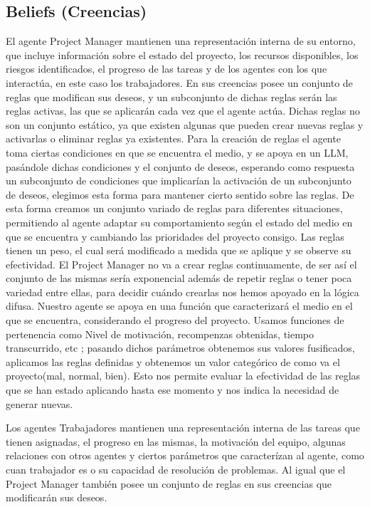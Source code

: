 \documentclass[a4paper, 12pt]{article}
\begin{document}
\subsection{Beliefs (Creencias)}
El agente Project Manager mantienen una representación interna de su entorno, que incluye información sobre el estado del proyecto, los recursos disponibles, los riesgos identificados, el progreso de las tareas y de los agentes con los que interactúa, en este caso los trabajadores. En sus creencias posee un conjunto de reglas que modifican sus deseos, y un subconjunto de dichas reglas serán las reglas activas, las que se aplicarán cada vez que el agente actúa. Dichas reglas no son un conjunto estático, ya que existen algunas que pueden crear nuevas reglas y activarlas o eliminar reglas ya existentes. Para la creación de reglas el agente toma ciertas condiciones en que se encuentra el medio, y se apoya en un LLM, pasándole dichas condiciones y el conjunto de deseos, esperando como respuesta un subconjunto de condiciones que implicarían la activación de un subconjunto de deseos, elegimos esta forma para mantener cierto sentido sobre las reglas. De esta forma creamos un conjunto variado de reglas para diferentes situaciones, permitiendo al agente adaptar su comportamiento según el estado del medio en que se encuentra y cambiando las prioridades del proyecto consigo. Las reglas tienen un peso, el cual será modificado a medida que se aplique y se observe su efectividad. 
El Project Manager no va a crear reglas continuamente, de ser así el conjunto de las mismas sería exponencial además de repetir reglas o tener poca variedad entre ellas, para decidir cuándo crearlas nos hemos apoyado en la lógica difusa. Nuestro agente se apoya en una función que caracterizará el medio en el que se encuentra, considerando el progreso del proyecto. Usamos funciones de pertenencia como Nivel de motivación, recompenzas obtenidas, tiempo transcurrido, etc ; pasando dichos parámetros obtenemos sus valores fusificados, aplicamos las reglas definidas y obtenemos un valor categórico de como va el proyecto(mal, normal, bien). Esto nos permite evaluar la efectividad de las reglas que se han estado aplicando hasta ese momento y nos indica la necesidad de generar nuevas.

Los agentes Trabajadores mantienen una representación interna de las tareas que tienen asignadas, el progreso en las mismas, la motivación del equipo, algunas relaciones con otros agentes y ciertos parámetros que caracterízan al agente, como cuan trabajador es o su capacidad de resolución de problemas. Al igual que el Project Manager también posee un conjunto de reglas en sus creencias que modificarán sus deseos.
\end{document}
